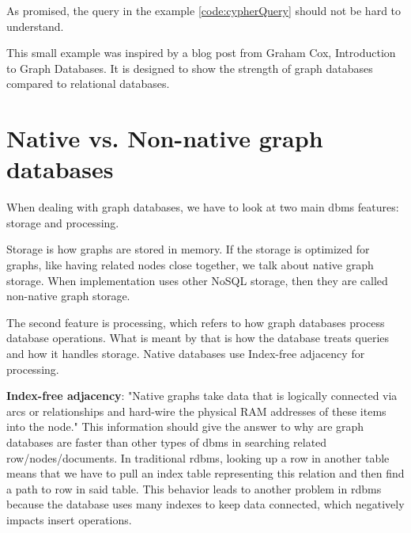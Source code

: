 
As promised, the query in the example \ref{code:cypherQuery} should not be hard to understand.

This small example was inspired by a blog post from Graham Cox, Introduction to Graph Databases. \cite{cox_introduction_2017}
It is designed to show the strength of graph databases compared to relational databases.

\section {Native vs. Non-native graph databases}

When dealing with graph databases, we have to look at two main \acrshort{dbms} features: storage and processing.

Storage is how graphs are stored in memory. If the storage is optimized for graphs, like having related nodes close together, we talk about native graph storage.
When implementation uses other NoSQL storage, then they are called non-native graph storage.

The second feature is processing, which refers to how graph databases process database operations.
What is meant by that is how the database treats queries and how it handles storage.
Native databases use Index-free adjacency for processing.
\cite{chao_graph_2018}

\textbf{Index-free adjacency}: "Native graphs take data that is logically connected via arcs or relationships and hard-wire the physical RAM addresses of these items into the node."
\cite{mccreary_neighborhood_2021}
This information should give the answer to why are graph databases are faster than other types of \acrshort{dbms} in searching related row/nodes/documents.
In traditional \acrshort{rdbms}, looking up a row in another table means that we have to pull an index table representing this relation and then find a path to row in said table.
This behavior leads to another problem in \acrshort{rdbms} because the database uses many indexes to keep data connected, which negatively impacts insert operations.

